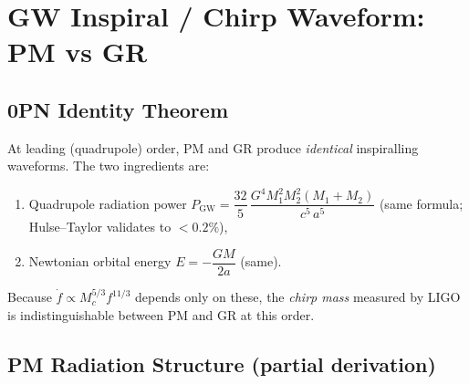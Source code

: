 \documentclass[10pt,twocolumn]{article}
\begin{document}
\section{GW Inspiral / Chirp Waveform: PM vs GR}

\subsection*{0PN Identity Theorem}

At leading (quadrupole) order, PM and GR produce \emph{identical}
inspiralling waveforms.
The two ingredients are:
\begin{enumerate}
  \item Quadrupole radiation power $P_\mathrm{GW}
        = \dfrac{32}{5}\,\dfrac{G^4 M_1^2 M_2^2(M_1{+}M_2)}{c^5\,a^5}$
        (same formula; Hulse–Taylor validates to $<0.2\%$),
  \item Newtonian orbital energy $E = -\dfrac{GM}{2a}$ (same).
\end{enumerate}
Because $\dot{f} \propto M_c^{5/3} f^{11/3}$ depends only on these, the
\emph{chirp mass} measured by LIGO is indistinguishable between PM and GR
at this order.

\subsection*{PM Radiation Structure (partial derivation)}
\end{document}
